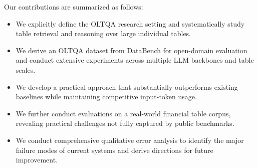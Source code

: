 Our contributions are summarized as follows:
\begin{itemize}
\item We explicitly define the OLTQA research setting and systematically study table retrieval and reasoning over large individual tables. 
\item  We derive an OLTQA dataset from DataBench for open-domain evaluation and conduct extensive experiments across multiple LLM backbones and table scales.
\item We develop a practical approach that substantially outperforms existing baselines while maintaining competitive input-token usage.
\item We further conduct evaluations on a real-world financial table corpus, revealing practical challenges not fully captured by public benchmarks.
\item We conduct comprehensive qualitative error analysis to identify the major failure modes of current systems and derive directions for future improvement. 
\end{itemize}
